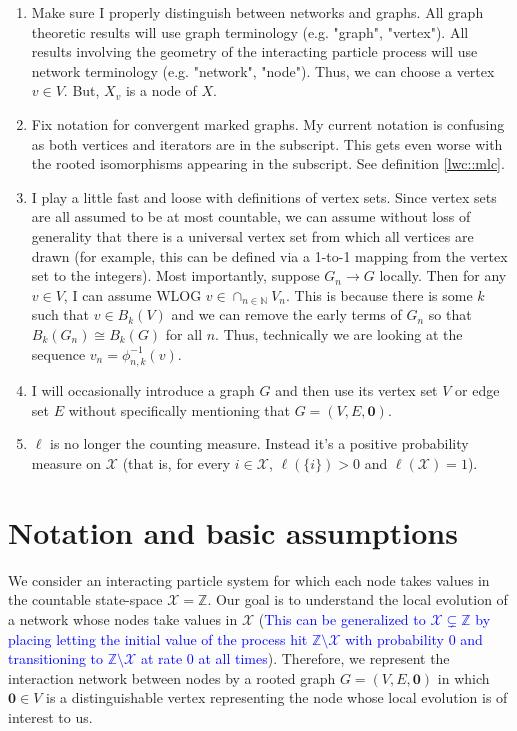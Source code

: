 \documentclass[12pt]{article}
\newcommand{\mb}{\mathbb}
\newcommand{\mc}{\mathcal}
\newcommand{\ra}{\rightarrow}
\newcommand{\tb}{\textcolor{blue}}
\newcommand{\sta}{\mc{X}}							%
\renewcommand{\root}{\mathbf{0}}					%
\newcommand{\Xf}{X}									%
\newcommand{\Sm}{\ell}								%
\newcommand{\vind}[1]{_{#1}}						%
\newcommand{\trnc}[1]{B_{#1}}						%
\begin{document}
\begin{enumerate}
\item Make sure I properly distinguish between networks and graphs. All graph theoretic results will use graph terminology (e.g. "graph", "vertex"). All results involving the geometry of the interacting particle process will use network terminology (e.g. "network", "node"). Thus, we can choose a vertex \(v \in V\). But, \(\Xf\vind{v}\) is a node of \(\Xf\).

\item Fix notation for convergent marked graphs. My current notation is confusing as both vertices and iterators are in the subscript. This gets even worse with the rooted isomorphisms appearing in the subscript. See definition \ref{lwc::mlc}.

\item I play a little fast and loose with definitions of vertex sets. Since vertex sets are all assumed to be at most countable, we can assume without loss of generality that there is a universal vertex set from which all vertices are drawn (for example, this can be defined via a 1-to-1 mapping from the vertex set to the integers). Most importantly, suppose \(G_n \ra G\) locally. Then for any \(v \in V\), I can assume WLOG \(v \in \cap_{n \in \mb{N}} V_n\). This is because there is some \(k\) such that \(v \in \trnc{k}(V)\) and we can remove the early terms of \(G_n\) so that \(\trnc{k}(G_n) \cong \trnc{k}(G)\) for all \(n\). Thus, technically we are looking at the sequence \(v_n = \phi_{n,k}^{-1}(v)\).

\item I will occasionally introduce a graph \(G\) and then use its vertex set \(V\) or edge set \(E\) without specifically mentioning that \(G = (V,E,\root)\). 

\item \(\Sm\) is no longer the counting measure. Instead it's a positive probability measure on \(\sta\) (that is, for every \(i \in \sta\), \(\Sm(\{i\}) > 0\) and \(\Sm(\sta) = 1\)).
\end{enumerate}



\section{Notation and basic assumptions}
\label{not}

We consider an interacting particle system for which each node takes values in the countable state-space \(\sta = \mb{Z}\). Our goal is to understand the local evolution of a network whose nodes take values in \(\sta\) (\tb{This can be generalized to \(\sta \subsetneq \mb{Z}\) by placing letting the initial value of the process hit \(\mb{Z}\setminus \sta\) with probability 0 and transitioning to \(\mb{Z}\setminus \sta\) at rate 0 at all times}). Therefore, we represent the interaction network between nodes by a rooted graph \(G = (V,E,\root)\) in which \(\root \in V\) is a distinguishable vertex representing the node whose local evolution is of interest to us.
\end{document}
